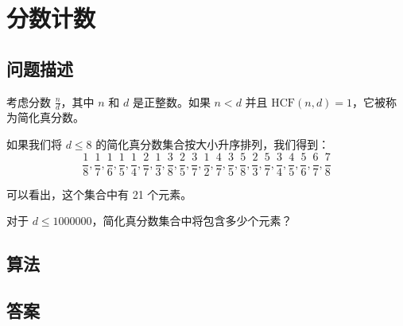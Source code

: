 \section{分数计数}
\subsection{问题描述}
\begin{tcolorbox}

考虑分数 \( \frac{n}{d} \)，其中 \( n \) 和 \( d \) 是正整数。如果 \( n < d \) 并且 \( \text{HCF}(n, d) = 1 \)，它被称为简化真分数。

如果我们将 \( d \leq 8 \) 的简化真分数集合按大小升序排列，我们得到：
\[ \frac{1}{8}, \frac{1}{7}, \frac{1}{6}, \frac{1}{5}, \frac{1}{4}, \frac{2}{7}, \frac{1}{3}, \frac{3}{8}, \frac{2}{5}, \frac{3}{7}, \frac{1}{2}, \frac{4}{7}, \frac{3}{5}, \frac{5}{8}, \frac{2}{3}, \frac{5}{7}, \frac{3}{4}, \frac{4}{5}, \frac{5}{6}, \frac{6}{7}, \frac{7}{8} \]

可以看出，这个集合中有 21 个元素。

对于 \( d \leq 1000000 \)，简化真分数集合中将包含多少个元素？
\end{tcolorbox}

\subsection{算法}


\subsection{答案}

